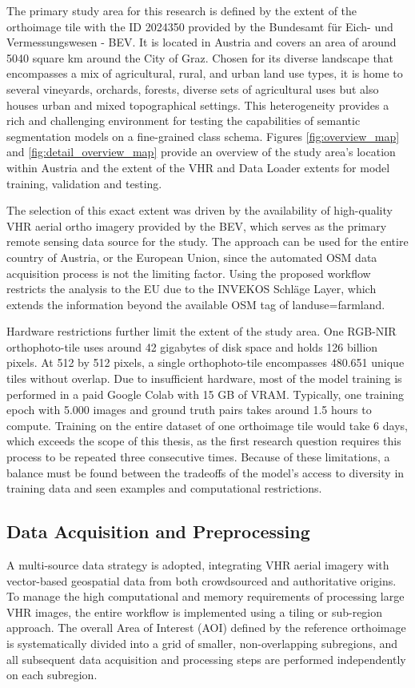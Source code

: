 \documentclass{report}
\begin{document}
\par
The primary study area for this research is defined by the extent of the orthoimage tile with the ID 2024350 provided by the Bundesamt für Eich- und Vermessungswesen - BEV. It is located in Austria and covers an area of around 5040 square km around the City of Graz. Chosen for its diverse landscape that encompasses a mix of agricultural, rural, and urban land use types, it is home to several vineyards, orchards, forests, diverse sets of agricultural uses but also houses urban and mixed topographical settings. This heterogeneity provides a rich and challenging environment for testing the capabilities of semantic segmentation models on a fine-grained class schema. Figures \ref{fig:overview_map} and \ref{fig:detail_overview_map} provide an overview of the study area's location within Austria and the extent of the VHR and Data Loader extents for model training, validation and testing. \par
The selection of this exact extent was driven by the availability of high-quality VHR aerial ortho imagery provided by the  BEV, which serves as the primary remote sensing data source for the study. The approach can be used for the entire country of Austria, or the European Union, since the automated OSM data acquisition process is not the limiting factor. Using the proposed workflow restricts the analysis to the EU due to the INVEKOS Schläge Layer, which extends the information beyond the available OSM tag of landuse=farmland. \par
Hardware restrictions further limit the extent of the study area. One RGB-NIR orthophoto-tile uses around 42 gigabytes of disk space and holds 126 billion pixels. At 512 by 512 pixels, a single orthophoto-tile encompasses 480.651 unique tiles without overlap. Due to insufficient hardware, most of the model training is performed in a paid Google Colab with 15 GB of VRAM. Typically, one training epoch with 5.000 images and ground truth pairs takes around 1.5 hours to compute. Training on the entire dataset of one orthoimage tile would take 6 days, which exceeds the scope of this thesis, as the first research question requires this process to be repeated three consecutive times. Because of these limitations, a balance must be found between the tradeoffs of the model's access to diversity in training data and seen examples and computational restrictions. 
\subsection{Data Acquisition and Preprocessing}
\label{seq:data_acquisition}
A multi-source data strategy is adopted, integrating VHR aerial imagery with vector-based geospatial data from both crowdsourced and authoritative origins. To manage the high computational and memory requirements of processing large VHR images, the entire workflow is implemented using a tiling or sub-region approach. The overall Area of Interest (AOI) defined by the reference orthoimage is systematically divided into a grid of smaller, non-overlapping subregions, and all subsequent data acquisition and processing steps are performed independently on each subregion.
\end{document}
